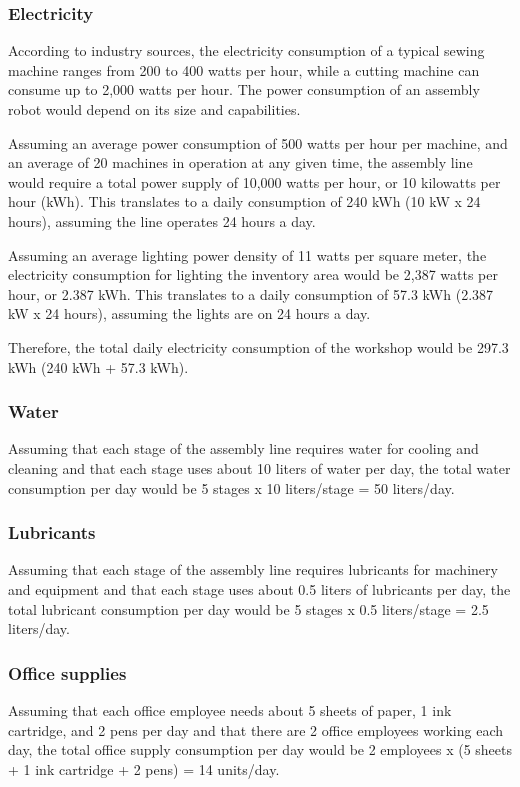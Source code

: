 \subsubsection{Electricity}
According to industry sources, the electricity consumption of a typical sewing machine ranges from 200 to 400 watts per hour, while a cutting machine can consume up to 2,000 watts per hour. The power consumption of an assembly robot would depend on its size and capabilities.

Assuming an average power consumption of 500 watts per hour per machine, and an average of 20 machines in operation at any given time, the assembly line would require a total power supply of 10,000 watts per hour, or 10 kilowatts per hour (kWh). This translates to a daily consumption of 240 kWh (10 kW x 24 hours), assuming the line operates 24 hours a day.

Assuming an average lighting power density of 11 watts per square meter, the electricity consumption for lighting the inventory area would be 2,387 watts per hour, or 2.387 kWh. This translates to a daily consumption of 57.3 kWh (2.387 kW x 24 hours), assuming the lights are on 24 hours a day.

Therefore, the total daily electricity consumption of the workshop would be 297.3 kWh (240 kWh + 57.3 kWh).

\subsubsection{Water}
Assuming that each stage of the assembly line requires water for cooling and cleaning and that each stage uses about 10 liters of water per day, the total water consumption per day would be 5 stages x 10 liters/stage = 50 liters/day.

\subsubsection{Lubricants}
Assuming that each stage of the assembly line requires lubricants for machinery and equipment and that each stage uses about 0.5 liters of lubricants per day, the total lubricant consumption per day would be 5 stages x 0.5 liters/stage = 2.5 liters/day.

\subsubsection{Office supplies}
Assuming that each office employee needs about 5 sheets of paper, 1 ink cartridge, and 2 pens per day and that there are 2 office employees working each day, the total office supply consumption per day would be 2 employees x (5 sheets + 1 ink cartridge + 2 pens) = 14 units/day.

